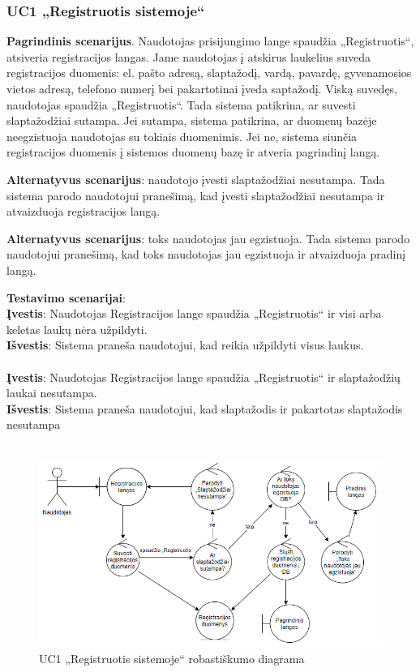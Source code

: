 \documentclass{VUMIFPSbakalaurinis}
\begin{document}
\subsubsection{UC1 „Registruotis sistemoje“}
\textbf{Pagrindinis scenarijus}. Naudotojas prisijungimo lange spaudžia „Registruotis“, atsiveria registracijos langas. Jame naudotojas į atskirus laukelius suveda registracijos duomenis: el. pašto adresą, slaptažodį, vardą, pavardę, gyvenamosios vietos adresą, telefono numerį bei pakartotinai įveda saptažodį. Viską suvedęs, naudotojas spaudžia „Registruotis“. Tada sistema patikrina, ar suvesti slaptažodžiai sutampa. Jei sutampa, sistema patikrina, ar duomenų bazėje neegzistuoja naudotojas su tokiais duomenimis. Jei ne, sistema siunčia registracijos duomenis į sistemos duomenų bazę ir atveria pagrindinį langą.
\par \textbf{Alternatyvus scenarijus}: naudotojo įvesti slaptažodžiai nesutampa. Tada sistema parodo naudotojui pranešimą, kad įvesti slaptažodžiai nesutampa ir atvaizduoja registracijos langą.
\par \textbf{Alternatyvus scenarijus}: toks naudotojas jau egzistuoja. Tada sistema parodo naudotojui pranešimą, kad toks naudotojas jau egzistuoja ir atvaizduoja pradinį langą.
\par \textbf{Testavimo scenarijai}:\\
\textbf{Įvestis}: Naudotojas Registracijos lange spaudžia „Registruotis“ ir visi arba keletas laukų nėra užpildyti. \\
\textbf{Išvestis}: Sistema praneša naudotojui, kad reikia užpildyti visus laukus. \\ \\
\textbf{Įvestis}: Naudotojas Registracijos lange spaudžia „Registruotis“ ir slaptažodžių laukai nesutampa. \\
\textbf{Išvestis}: Sistema praneša naudotojui, kad slaptažodis ir pakartotas slaptažodis nesutampa\\ \\

\begin{figure}[H]
	\centering
	\includegraphics[scale=0.6]{img/Robustness/UC1}
	\caption{UC1 „Registruotis sistemoje“ robastiškumo diagrama}
	\label{img:uc1rob}
\end{figure}
\end{document}
